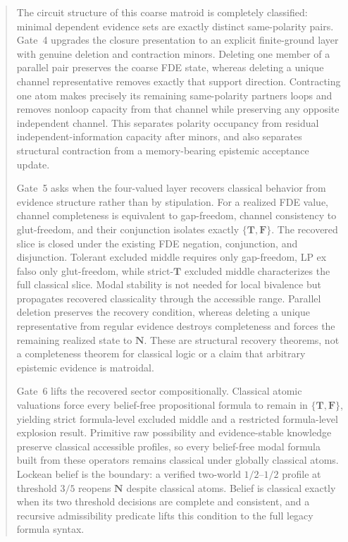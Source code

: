 \documentclass[11pt,a4paper]{article}
\theoremstyle{definition}
\newcommand{\Tval}{\mathbf{T}}
\newcommand{\Fval}{\mathbf{F}}
\newcommand{\Nval}{\mathbf{N}}
\begin{document}
\begin{abstract}
The circuit structure of this coarse matroid is completely classified: minimal dependent evidence sets are exactly distinct same-polarity pairs. Gate~4 upgrades the closure presentation to an explicit finite-ground layer with genuine deletion and contraction minors. Deleting one member of a parallel pair preserves the coarse FDE state, whereas deleting a unique channel representative removes exactly that support direction. Contracting one atom makes precisely its remaining same-polarity partners loops and removes nonloop capacity from that channel while preserving any opposite independent channel. This separates polarity occupancy from residual independent-information capacity after minors, and also separates structural contraction from a memory-bearing epistemic acceptance update.

Gate~5 asks when the four-valued layer recovers classical behavior from evidence structure rather than by stipulation. For a realized FDE value, channel completeness is equivalent to gap-freedom, channel consistency to glut-freedom, and their conjunction isolates exactly \(\{\Tval,\Fval\}\). The recovered slice is closed under the existing FDE negation, conjunction, and disjunction. Tolerant excluded middle requires only gap-freedom, LP ex falso only glut-freedom, while strict-\(\Tval\) excluded middle characterizes the full classical slice. Modal stability is not needed for local bivalence but propagates recovered classicality through the accessible range. Parallel deletion preserves the recovery condition, whereas deleting a unique representative from regular evidence destroys completeness and forces the remaining realized state to \(\Nval\). These are structural recovery theorems, not a completeness theorem for classical logic or a claim that arbitrary epistemic evidence is matroidal.

Gate~6 lifts the recovered sector compositionally. Classical atomic valuations force every belief-free propositional formula to remain in \(\{\Tval,\Fval\}\), yielding strict formula-level excluded middle and a restricted formula-level explosion result. Primitive raw possibility and evidence-stable knowledge preserve classical accessible profiles, so every belief-free modal formula built from these operators remains classical under globally classical atoms. Lockean belief is the boundary: a verified two-world \(1/2\)--\(1/2\) profile at threshold \(3/5\) reopens \(\Nval\) despite classical atoms. Belief is classical exactly when its two threshold decisions are complete and consistent, and a recursive admissibility predicate lifts this condition to the full legacy formula syntax.


\end{abstract}
\end{document}
